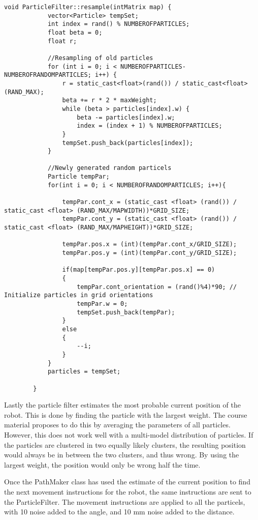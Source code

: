 \documentclass[Main]{subfiles}
\begin{document}
	\begin{lstlisting}[caption=Resampling function of ParticleFilter, style=Code-C++, label=lst:resample, basicstyle=\scriptsize]
		void ParticleFilter::resample(intMatrix map) {
			vector<Particle> tempSet;
			int index = rand() % NUMBEROFPARTICLES;
			float beta = 0;
			float r;
		
			//Resampling of old particles
			for (int i = 0; i < NUMBEROFPARTICLES-NUMBEROFRANDOMPARTICLES; i++) {
				r = static_cast<float>(rand()) / static_cast<float>(RAND_MAX);
				beta += r * 2 * maxWeight;
				while (beta > particles[index].w) {
					beta -= particles[index].w;
					index = (index + 1) % NUMBEROFPARTICLES;
				}
				tempSet.push_back(particles[index]);
			}
		
			//Newly generated random particels
			Particle tempPar;
			for(int i = 0; i < NUMBEROFRANDOMPARTICLES; i++){
		
				tempPar.cont_x = (static_cast <float> (rand()) / static_cast <float> (RAND_MAX/MAPWIDTH))*GRID_SIZE;
				tempPar.cont_y = (static_cast <float> (rand()) / static_cast <float> (RAND_MAX/MAPHEIGHT))*GRID_SIZE;
	
				tempPar.pos.x = (int)(tempPar.cont_x/GRID_SIZE);
				tempPar.pos.y = (int)(tempPar.cont_y/GRID_SIZE);
		
				if(map[tempPar.pos.y][tempPar.pos.x] == 0)
				{
					tempPar.cont_orientation = (rand()%4)*90; // Initialize particles in grid orientations
					tempPar.w = 0;
					tempSet.push_back(tempPar);
				}
				else
				{
					--i;
				}
			}
			particles = tempSet;
	
		}	
	\end{lstlisting}

	Lastly the particle filter estimates the most probable current position of the robot. 
	This is done by finding the particle with the largest weight.
	The course material proposes to do this by averaging the parameters of all particles.
	However, this does not work well with a multi-model distribution of particles.
	If the particles are clustered in two equally likely clusters, the resulting position would always be in between the two clusters, and thus wrong.
	By using the largest weight, the position would only be wrong half the time.
	
	Once the PathMaker class has used the estimate of the current position to find the next movement instructions for the robot, the same instructions are sent to the ParticleFilter.
	The movement instructions are applied to all the particels, with 10 \degree noise added to the angle, and 10 mm noise added to the distance.
	
\end{document}
